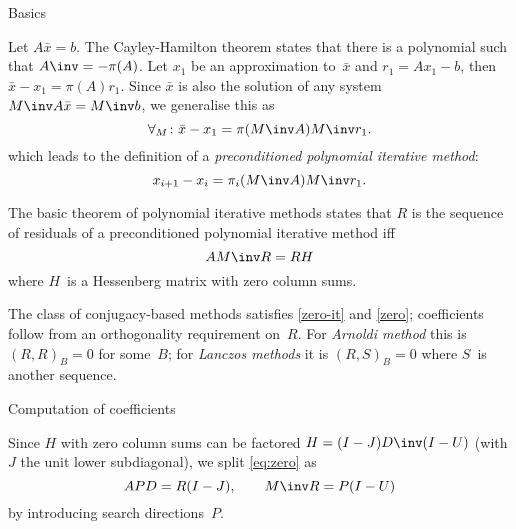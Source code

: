  {Basics}

Let $A\bar x=b$. The Cayley-Hamilton theorem states that there is a
polynomial such that $A\inv=-\pi(A)$. Let $x_1$ be an approximation
to~$\bar x$ and $r_1=Ax_1-b$, then $\bar x-x_1=\pi(A)r_1$. Since $\bar
x$ is also the solution of any system $M\inv A\bar x=M\inv b$, we
generalise this as
\begin{equation}\forall_M\colon\bar x-x_1=\pi(M\inv A)M\inv r_1.
\end{equation}
which leads to the definition of a {\em preconditioned
polynomial iterative method}:
\begin{equation}x_{i+1}-x_i=\pi_i(M\inv A)M\inv r_1.
    \label{eq:zero-it}\end{equation}

The basic theorem of polynomial iterative methods states that $R$ is
the sequence of residuals of a preconditioned polynomial iterative
method iff
\begin{equation}AM\inv R=RH\label{eq:zero}\end{equation}
where $H$~is a Hessenberg matrix with zero column sums.

The class of conjugacy-based methods satisfies \eqref{zero-it} and
\eqref{zero}; coefficients follow from an orthogonality requirement
on~$R$. For {\em Arnoldi method} this is $(R,R)_B=0$ for some~$B$; for
{\em Lanczos methods} it is $(R,S)_B=0$ where $S$~is another sequence.

 {Computation of coefficients}

Since $H$ with zero column sums can be factored $H=(I-J)D\inv(I-U)$
(with $J$ the unit lower subdiagonal), we split \eqref{eq:zero} as
\begin{equation}APD=R(I-J),\qquad M\inv R=P(I-U)\end{equation}
by introducing search directions~$P$.

